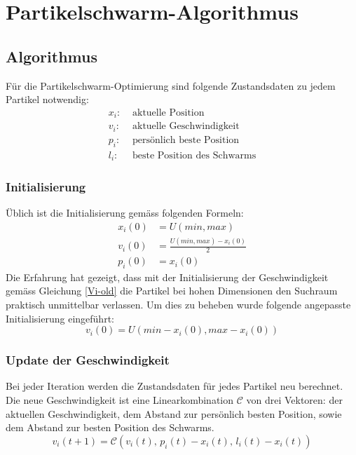 \section{Partikelschwarm-Algorithmus}

\subsection{Algorithmus}
Für die Partikelschwarm-Optimierung sind folgende Zustandsdaten zu jedem Partikel notwendig:
\begin{align*}
	x_i: & \text{ aktuelle Position}\\
	v_i: & \text{ aktuelle Geschwindigkeit}\\
	p_i: & \text{ persönlich beste Position} \\
	l_i: & \text{ beste Position des Schwarms}
\end{align*} 

\subsubsection{Initialisierung}
Üblich ist die Initialisierung gemäss folgenden Formeln:
\begin{align}
	x_i(0) &= U(min,max) \\
	v_i(0) &= \frac{U(min,max) - x_i(0)}{2} \label{Vi-old} \\ 
	p_i(0) &= x_i(0)
\end{align}
Die Erfahrung hat gezeigt, dass mit der Initialisierung der Geschwindigkeit gemäss Gleichung \ref{Vi-old} die Partikel bei hohen Dimensionen den Suchraum praktisch unmittelbar verlassen. Um dies zu beheben wurde folgende angepasste Initialisierung eingeführt:
\begin{equation}
	v_i(0) = U(min - x_i(0), max - x_i(0))
\end{equation}

\subsubsection{Update der Geschwindigkeit}
Bei jeder Iteration werden die Zustandsdaten für jedes Partikel neu berechnet. Die neue Geschwindigkeit ist eine Linearkombination $\mathcal{C}$ von drei Vektoren: der aktuellen Geschwindigkeit, dem Abstand zur persönlich besten Position, sowie dem Abstand zur besten Position des Schwarms.
\begin{equation}
	v_{i}(t+1) = \mathcal{C}(v_i(t),\, p_i(t)-x_i(t),\, l_i(t)-x_i(t))
\end{equation}

